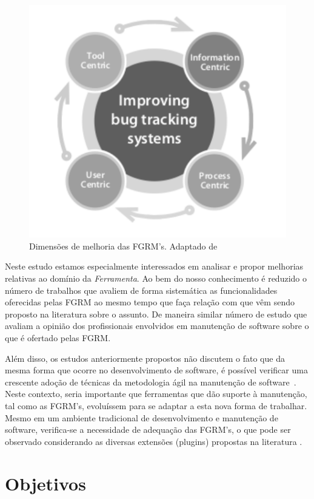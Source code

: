\begin{figure}[htpb] \centering
	\includegraphics[width=0.666666\linewidth]
	{chapter-intro/img/dimensoes_melhorias_fgrm.pdf}
	\caption{Dimensões de melhoria das FGRM's. Adaptado
		de~\cite{zimmermann2005mining}}\label{fig:dimensoes_melhorias_fgrm}
\end{figure}

Neste estudo estamos especialmente interessados em analisar e propor melhorias
relativas ao domínio da \textit{Ferramenta}. Ao bem do nosso conhecimento é
reduzido o número de trabalhos que avaliem de forma sistemática as
funcionalidades oferecidas pelas FGRM ao mesmo tempo que faça relação com que
vêm sendo proposto na literatura sobre o assunto. De maneira similar número de
estudo que avaliam a opinião dos profissionais envolvidos em manutenção de
software sobre o que é ofertado pelas FGRM\@.

Além disso, os estudos anteriormente propostos não discutem o fato que da mesma
forma que ocorre no desenvolvimento de software, é possível verificar uma
crescente adoção de técnicas da metodologia ágil na manutenção de
software~\cite{Soltan2016,Devulapally2015, Heeager2015}. Neste contexto, seria
importante que ferramentas que dão suporte à manutenção, tal como as FGRM's,
evoluíssem para se adaptar a esta nova forma de trabalhar. Mesmo em um
ambiente tradicional de  desenvolvimento e manutenção de software, verifica-se a
necessidade de adequação das FGRM's, o que pode ser observado considerando as
diversas extensões (plugins) propostas na literatura
\cite{101186,Thung:2014:BIT:2635868.2661678,Kononenko:2014:DED:2591062.2591075}.

\section{Objetivos}
\label{sec:intro-objetivos}

